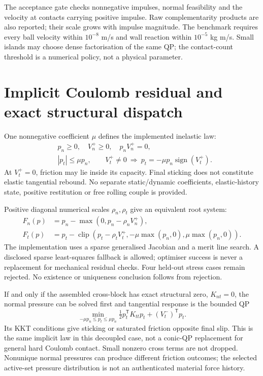 \documentclass[11pt]{article}
\begin{document}
The acceptance gate checks nonnegative impulses, normal feasibility and the
velocity at contacts carrying positive impulse. Raw complementarity products
are also reported; their scale grows with impulse magnitude. The benchmark
requires every ball velocity within $10^{-8}$ m/s and wall reaction within
$10^{-5}$ kg m/s. Small islands may choose dense factorisation of the same QP;
the contact-count threshold is a numerical policy, not a physical parameter.

\section{Implicit Coulomb residual and exact structural dispatch}
One nonnegative coefficient $\mu$ defines the implemented inelastic law:
\begin{align}
 &p_n\geq0,\quad V_n^+\geq0,\quad p_n V_n^+=0,\\
 &|p_t|\leq\mu p_n,\qquad
 V_t^+\ne0\ \Longrightarrow\ p_t=-\mu p_n\operatorname{sign}(V_t^+).
\end{align}
At $V_t^+=0$, friction may lie inside its capacity. Final sticking does not
constitute elastic tangential rebound. No separate static/dynamic coefficients,
elastic-history state, positive restitution or free rolling couple is provided.

Positive diagonal numerical scales $\rho_n,\rho_t$ give an equivalent root system:
\begin{align}
 F_n(p)&=p_n-\max(0,p_n-\rho_n V_n^+),\\
 F_t(p)&=p_t-\operatorname{clip}(p_t-\rho_t V_t^+,
                  -\mu\max(p_n,0),\mu\max(p_n,0)).
\end{align}
The implementation uses a sparse generalised Jacobian and a merit line search.
A disclosed sparse least-squares fallback is allowed; optimiser success is
never a replacement for mechanical residual checks. Four held-out stress cases
remain rejected. No existence or uniqueness conclusion follows from rejection.

If and only if the assembled cross-block has exact structural zero,
$K_{nt}=0$, the normal pressure can be solved first and tangential response is
the bounded QP
\begin{equation}
 \min_{-\mu p_n\leq p_t\leq\mu p_n}
 \tfrac12p_t^{\mathsf T}K_{tt}p_t+(V_t^-)^{\mathsf T}p_t.
\end{equation}
Its KKT conditions give sticking or saturated friction opposite final slip.
This is the same implicit law in this decoupled case, not a conic-QP replacement
for general hard Coulomb contact. Small nonzero cross terms are not dropped.
Nonunique normal pressures can produce different friction outcomes; the selected
active-set pressure distribution is not an authenticated material force history.
\end{document}
